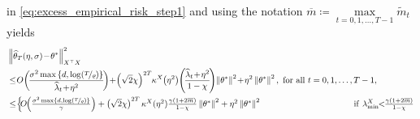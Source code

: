 \documentclass[11pt]{article}
\theoremstyle{definition}
\theoremstyle{plain}
\newcommand{\Norm}[1]{\left\| #1 \right\|}
\providecommand{\norm}[1]{\Norm{#1}}
\begin{document}
 in \eqref{eq:excess_empirical_risk_step1} and using the notation $\overline{m} \coloneq \underset{t=0,1,\ldots, T-1}{\max} \widetilde{m}_t$ yields
\begin{align}
    &\norm{\widehat{\theta}_{T}(\eta, \sigma) \hspace{-0.15em}-\hspace{-0.15em} \theta^{*}}^2_{X^{\top}X} \hspace{-0.2em}\\
    &\leq\hspace{-0.2em} O\hspace{-0.15em}\left(\hspace{-0.15em}\frac{\sigma^2 \max\left\{d, \log(\nicefrac{T}{\varrho})\right\}}{\widehat{\lambda}_t \hspace{-0.15em}+\hspace{-0.15em} \eta^2}\hspace{-0.15em}\right) \hspace{-0.2em}+\hspace{-0.2em} \left(\sqrt{2}\chi\right)^{2T}\hspace{-0.2em}\kappa^{X}\hspace{-0.2em}\left(\eta^2\right)\hspace{-0.2em}\left(\hspace{-0.15em}\frac{\widehat{\lambda}_t \hspace{-0.15em}+\hspace{-0.15em} \eta^2}{1 - \chi}\hspace{-0.15em}\right)\hspace{-0.15em}\norm{\theta^{*}}^2 \hspace{-0.15em}+\hspace{-0.15em} \eta^2\norm{\theta^{*}}^2, \ \mathrm{for\ all\ } t=0,1,\ldots, T-1, \\
    &\leq\hspace{-0.2em} \begin{cases}
            \hspace{-0.25em}O\hspace{-0.25em}\left(\frac{\sigma^2 \max\left\{d, \log(\nicefrac{T}{\varrho})\right\}}{\gamma}\right) + \left(\sqrt{2}\chi\right)^{2T} \kappa^{X}(\eta^2)\frac{\gamma\left(1 + 2\overline{m}\right)}{1 - \chi}\norm{\theta^{*}}^2 + \eta^2\norm{\theta^{*}}^2 \qquad\qquad\qquad\qquad\qquad &\mathrm{if} \ \lambda^{X}_{\min} \hspace{-0.35em}<\hspace{-0.35em} \frac{\gamma\left(1+2\overline{m}\right)}{1-\chi} \\ 

\end{cases}
\end{align}
\end{document}
